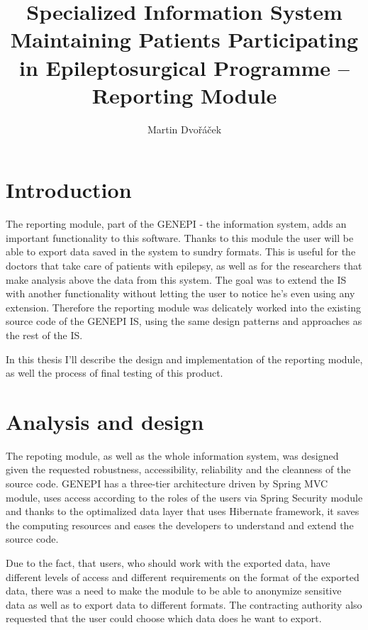 \documentclass[thesis=B,english]{FITthesis}[2012/10/20]
\title{Specialized Information System Maintaining Patients Participating in Epileptosurgical Programme – Reporting Module}
\author{Martin Dvořáček} %
\begin{document}

\chapter{Introduction}
The reporting module, part of the GENEPI - the information system, adds an important functionality to this software. Thanks to this module the user will be able to export data saved in the system to sundry formats. This is useful for the doctors that take care of patients with epilepsy, as well as for the researchers that make analysis above the data from this system. The goal was to extend the IS with another functionality without letting the user to notice he's even using any extension. Therefore the reporting module was delicately worked into the existing source code of the GENEPI IS, using the same design patterns and approaches as the rest of the IS.

In this thesis I'll describe the design and implementation of the reporting module, as well the process of final testing of this product.

\chapter{Analysis and design}
The repoting module, as well as the whole information system, was designed given the requested robustness, accessibility, reliability and the cleanness of the source code. GENEPI has a three-tier architecture driven by Spring MVC module, uses access according to the roles of the users via Spring Security module and thanks to the optimalized data layer that uses Hibernate framework, it saves the computing resources and eases the developers to understand and extend the source code.

Due to the fact, that users, who should work with the exported data, have different levels of access and different requirements on the format of the exported data, there was a need to make the module to be able to anonymize sensitive data as well as to export data to different formats. The contracting authority also requested that the user could choose which data does he want to export.
\end{document}
